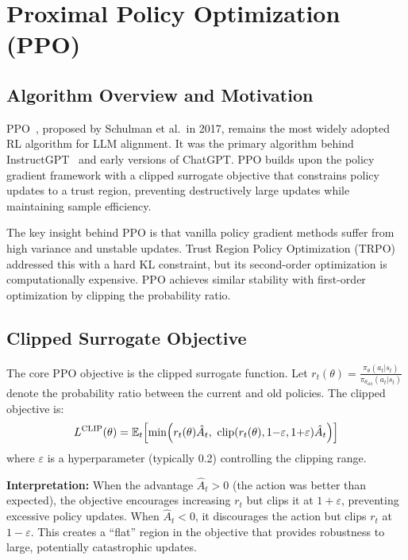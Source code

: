 \section{Proximal Policy Optimization (PPO)}
\label{sec:ppo}

\subsection{Algorithm Overview and Motivation}

PPO~\cite{schulman2017ppo}, proposed by Schulman et al.\ in 2017, remains the most widely adopted RL algorithm for LLM alignment. It was the primary algorithm behind InstructGPT~\cite{ouyang2022instructgpt} and early versions of ChatGPT. PPO builds upon the policy gradient framework with a clipped surrogate objective that constrains policy updates to a trust region, preventing destructively large updates while maintaining sample efficiency.

The key insight behind PPO is that vanilla policy gradient methods suffer from high variance and unstable updates. Trust Region Policy Optimization (TRPO) addressed this with a hard KL constraint, but its second-order optimization is computationally expensive. PPO achieves similar stability with first-order optimization by clipping the probability ratio.

\subsection{Clipped Surrogate Objective}

The core PPO objective is the clipped surrogate function. Let $r_t(\theta) = \frac{\pi_\theta(a_t|s_t)}{\pi_{\theta_{\text{old}}}(a_t|s_t)}$ denote the probability ratio between the current and old policies. The clipped objective is:
\begin{equation}
L^{\text{CLIP}}(\theta) = \mathbb{E}_t\!\left[\min\!\left(r_t(\theta)\hat{A}_t,\ \text{clip}(r_t(\theta), 1{-}\varepsilon, 1{+}\varepsilon)\hat{A}_t\right)\right]
\label{eq:ppo_clip}
\end{equation}
where $\varepsilon$ is a hyperparameter (typically 0.2) controlling the clipping range.

\textbf{Interpretation:} When the advantage $\hat{A}_t > 0$ (the action was better than expected), the objective encourages increasing $r_t$ but clips it at $1 + \varepsilon$, preventing excessive policy updates. When $\hat{A}_t < 0$, it discourages the action but clips $r_t$ at $1 - \varepsilon$. This creates a ``flat'' region in the objective that provides robustness to large, potentially catastrophic updates.

